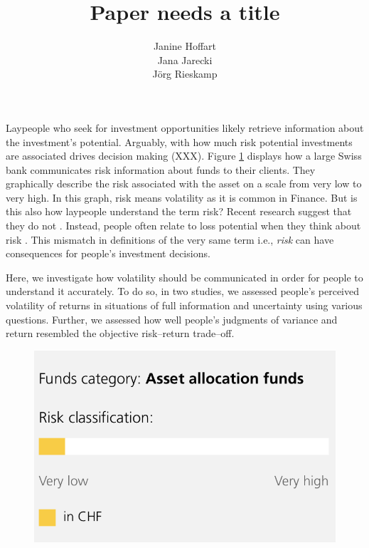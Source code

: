 \documentclass[a4paper,man, natbib,floatsintext]{apa6} %
\title{Paper needs a title}
\author{Janine Hoffart\\Jana Jarecki\\Jörg Rieskamp}
\affiliation{University of Basel}
\begin{document}
\maketitle

Laypeople who seek for investment opportunities likely retrieve information about the investment's potential. Arguably, with how much risk potential investments are associated drives decision making (XXX). Figure \ref{fig:pfrisk} displays how a large Swiss bank communicates risk information about funds to their clients. They graphically describe the risk associated with the asset on a scale from very low to very high. %
In this graph, risk means volatility as it is common in Finance. 
But is this also how laypeople understand the term risk? Recent research suggest that they do not \citep{Mohr2010a}. Instead, people often relate to loss potential when they think about risk \citep{Duxbury2004, Sachse2012}. This mismatch in definitions of the very same term i.e., \textit{risk} can have consequences for people's investment decisions. 

Here, we investigate how volatility should be communicated in order for people to understand it accurately. To do so, in two studies, we assessed people's perceived volatility of returns in situations of full information and uncertainty using various questions. Further, we assessed how well people's judgments of variance and return resembled the objective risk--return trade--off.
\begin{figure}[!htbp] 
  \centering
 \includegraphics[width=.4\linewidth, keepaspectratio]{pf_risk1.png} 
  \caption{}
  \label{fig:pfrisk}
\end{figure}
\end{document}
